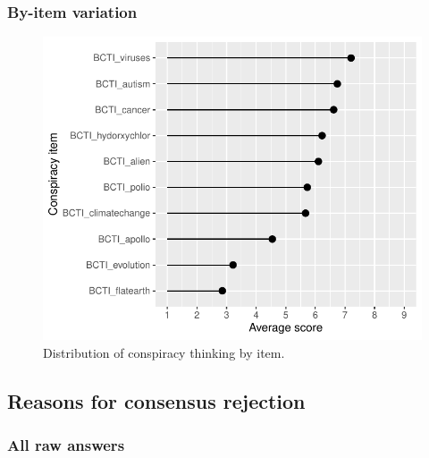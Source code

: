 \documentclass[
  doc,floatsintext]{apa6}
\begin{document}
\subsubsection{By-item variation}\label{by-item-variation-2}



\begin{figure}
\centering
\includegraphics{output/figures/exp3-conspiracy-items.pdf}
\caption{\label{fig:exp3-conspiracy-items}Distribution of conspiracy thinking by item.}
\end{figure}

\subsection{Reasons for consensus rejection}\label{reasons-for-consensus-rejection-1}

\subsubsection{All raw answers}\label{all-raw-answers-1}
\end{document}
